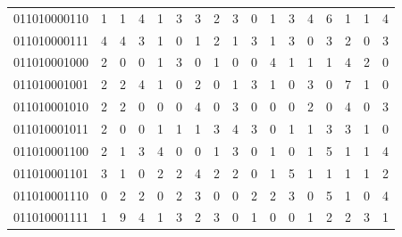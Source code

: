 \documentclass[10pt,a4paper]{article}
\begin{document}
\begin{longtable}{ |c|c|c|c|c|c|c|c|c|c|c|c|c|c|c|c|c| }
    011010000110              & 1                            & 1                                & 4                            & 1                              & 3   & 3   & 2   & 3   & 0   & 1   & 3   & 4   & 6   & 1   & 1   & 4   \\
    011010000111              & 4                            & 4                                & 3                            & 1                              & 0   & 1   & 2   & 1   & 3   & 1   & 3   & 0   & 3   & 2   & 0   & 3   \\
    011010001000              & 2                            & 0                                & 0                            & 1                              & 3   & 0   & 1   & 0   & 0   & 4   & 1   & 1   & 1   & 4   & 2   & 0   \\
    011010001001              & 2                            & 2                                & 4                            & 1                              & 0   & 2   & 0   & 1   & 3   & 1   & 0   & 3   & 0   & 7   & 1   & 0   \\
    011010001010              & 2                            & 2                                & 0                            & 0                              & 0   & 4   & 0   & 3   & 0   & 0   & 0   & 2   & 0   & 4   & 0   & 3   \\
    011010001011              & 2                            & 0                                & 0                            & 1                              & 1   & 1   & 3   & 4   & 3   & 0   & 1   & 1   & 3   & 3   & 1   & 0   \\
    011010001100              & 2                            & 1                                & 3                            & 4                              & 0   & 0   & 1   & 3   & 0   & 1   & 0   & 1   & 5   & 1   & 1   & 4   \\
    011010001101              & 3                            & 1                                & 0                            & 2                              & 2   & 4   & 2   & 2   & 0   & 1   & 5   & 1   & 1   & 1   & 1   & 2   \\
    011010001110              & 0                            & 2                                & 2                            & 0                              & 2   & 3   & 0   & 0   & 2   & 2   & 3   & 0   & 5   & 1   & 0   & 4   \\
    011010001111              & 1                            & 9                                & 4                            & 1                              & 3   & 2   & 3   & 0   & 1   & 0   & 0   & 1   & 2   & 2   & 3   & 1   \\

\end{longtable}
\end{document}
